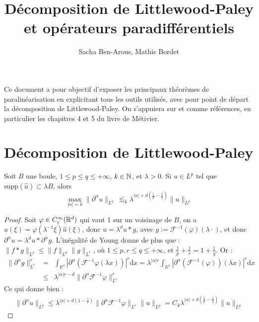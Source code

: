 \documentclass[11pt,a4paper]{article}
\title{\textbf{Décomposition de Littlewood-Paley et opérateurs paradifférentiels}}
\date{}
\author{Sacha Ben-Arous, Mathis Bordet}
\begin{document}
\maketitle

Ce document a pour objectif d'exposer les principaux théorèmes de paralinéarisation en explicitant tous les outils utilisés, avec pour point de départ la décomposition de Littlewood-Paley. On s'appuiera sur \cite{metivier} et \cite{dgv} comme références, en particulier les chapitres 4 et 5 du livre de Métivier.
\section{Décomposition de Littlewood-Paley}


\begin{lemma}
Soit $B$ une boule, $1\leq p  \leq  q \leq +\infty$, $k\in \mathbb N$, et $\lambda >0$. Si $u\in L^p$ tel que $\text{supp}(\hat{u})\subset \lambda B$, alors
\begin{equation}\label{bernstein}
\max_{|\alpha|=k}{\| \partial^\alpha u\|_{L^q}} \ \lesssim_k \lambda^{|\alpha| +d \left ( \frac{1}{p}- \frac{1}{q} \right )}\|u\|_{L^p}
\end{equation}
\end{lemma}

\begin{proof}
Soit $\varphi \in C^\infty_c(\mathbb R^d)$ qui vaut 1 sur un voisinage de $B$, on a $\hat{u}(\xi)=\varphi(\lambda^{-1}\xi)\hat{u}(\xi)$, donc $u=\lambda^d u * g$, avec $g := \mathcal{F}^{-1}(\varphi)(\lambda \cdot)$, et donc $\partial^\alpha u =\lambda^d u * \partial^\alpha g$. L'inégalité de Young donne de plus que : $\|f * g \|_{L^q} \leq \|f\|_{L^p} \|g\|_{L^r}$, où $1\leq p,r\leq q \leq +\infty$, et $\frac{1}{p}+\frac{1}{r}= 1 + \frac{1}{q}$. Or :
\begin{eqnarray*}
\| \partial^\alpha g \|^r_{L^r} &=& \int_{\mathbb{R^d}} \left | \partial^\alpha \left(\mathcal{F}^{-1} \varphi(\lambda x)\right) \right |^r \mathrm{d}x =   \lambda^{|\alpha|r} \int_{\mathbb{R^d}} \left | \partial^\alpha \left(\mathcal{F}^{-1}(\varphi)\right)(\lambda x) \right |^r \mathrm{d}x  \\
&\leq& \lambda^{|\alpha|r-d} \| \partial^\alpha \mathcal{F}^{-1}\varphi \|^r_{L^r}
\end{eqnarray*}
Ce qui donne bien :
\begin{eqnarray*}
\| \partial^\alpha u \|_{L^q} \leq \lambda^{|\alpha| + d(1-\frac{1}{r})} \| \partial^\alpha \mathcal{F}^{-1}\varphi \|_{L^r} \|u\|_{L^p} = C_k\lambda^{|\alpha| + d(\frac{1}{p}-\frac{1}{q})} \|u\|_{L^p}
\end{eqnarray*}
\end{proof}
\end{document}
